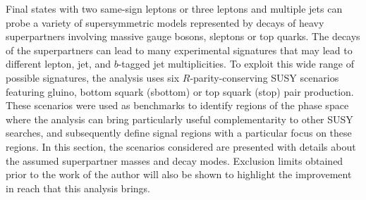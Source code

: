 
Final states with two same-sign leptons or three leptons and multiple jets can probe a variety of supersymmetric models 
represented by decays of heavy superpartners involving massive gauge bosons, sleptons or top quarks. 
The decays of the superpartners can lead to many experimental signatures that may lead to different lepton, jet, and $b$-tagged jet multiplicities.
To exploit this wide range of possible signatures, the analysis uses six $R$-parity-conserving SUSY scenarios 
featuring gluino, bottom squark (sbottom) or top squark (stop) pair production. 
These scenarios were used as benchmarks to identify regions of the phase space 
where the analysis can bring particularly useful complementarity to other SUSY 
searches, 
and subsequently define signal regions with a particular focus on these 
regions. 
In this section, the scenarios considered are presented with details about 
the assumed superpartner masses and decay modes.  
Exclusion limits obtained prior to the work of the author will also 
be shown to highlight the improvement in reach that this analysis brings.

